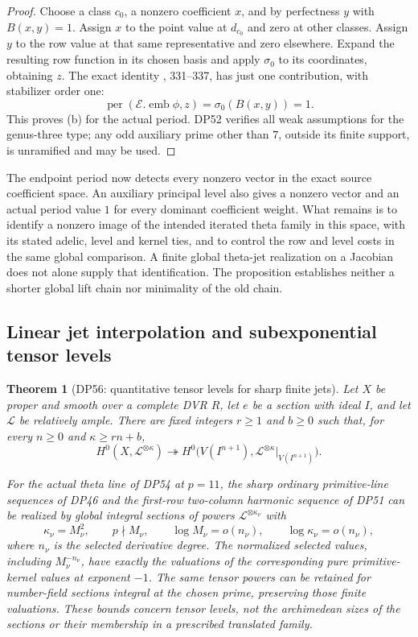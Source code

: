 \documentclass[11pt,a4paper]{article}
\newtheorem{theorem}{Theorem}[section]
\theoremstyle{definition}\newtheorem{remark}[theorem]{Remark}
\begin{document}
\begin{proof}
Choose a class $c_0$, a nonzero coefficient $x$, and by perfectness
$y$ with $B(x,y)=1$.
Assign $x$ to the point value at $d_{c_0}$ and zero at other classes.
Assign $y$ to the row value at that same representative and zero elsewhere.
Expand the resulting row function in its chosen basis and apply
$\sigma_0$ to its coordinates, obtaining $z$.
The exact identity , 331--337, has just one
contribution, with stabilizer order one:
\[
 \operatorname{per}(\mathcal E.\operatorname{emb}\phi,z)
                    =\sigma_0(B(x,y))=1.
\]
This proves (b) for the actual period.
DP52 verifies all weak assumptions for the genus-three type;
any odd auxiliary prime other than $7$, outside its finite support,
is unramified and may be used.
\end{proof}

The endpoint period now detects every nonzero vector in the exact source
coefficient space. An auxiliary principal level also gives a nonzero
vector and an actual period value $1$ for every dominant coefficient weight.
What remains is to identify a nonzero image of the intended iterated theta
family in this space, with its stated adelic, level and kernel ties, and to
control the row and level costs in the same global comparison.
A finite global theta-jet realization on a Jacobian does not alone supply
that identification. The proposition establishes neither a shorter
global lift chain nor minimality of the old chain.


\subsection{Linear jet interpolation and subexponential tensor levels}

\begin{theorem}[DP56: quantitative tensor levels for sharp finite jets]\label{DP56}
Let $X$ be proper and smooth over a complete DVR $R$, let $e$ be a section with ideal $I$, and let $\mathcal L$ be relatively ample.
There are fixed integers $r\ge1$ and $b\ge0$ such that, for every $n\ge0$ and $\kappa\ge rn+b$,
\begin{equation}\label{eq:linearjetthreshold}
 H^0(X,\mathcal L^{\otimes\kappa})
 \twoheadrightarrow
 H^0\bigl(V(I^{n+1}),\mathcal L^{\otimes\kappa}|_{V(I^{n+1})}\bigr).
\end{equation}

For the actual theta line of DP54 at $p=11$, the sharp ordinary primitive-line sequences of DP46 and the first-row two-column harmonic sequence of DP51 can be realized by global integral sections of powers $\mathcal L^{\otimes\kappa_\nu}$ with
\[
 \kappa_\nu=M_\nu^2,\qquad p\nmid M_\nu,
 \qquad \log M_\nu=o(n_\nu),
 \qquad \log\kappa_\nu=o(n_\nu),
\]
where $n_\nu$ is the selected derivative degree.
The normalized selected values, including $M_\nu^{-n_\nu}$, have exactly the valuations of the corresponding pure primitive-kernel values at exponent $-1$.
The same tensor powers can be retained for number-field sections integral at the chosen prime, preserving those finite valuations.
These bounds concern tensor levels, not the archimedean sizes of the sections or their membership in a prescribed translated family.
\end{theorem}
\end{document}
